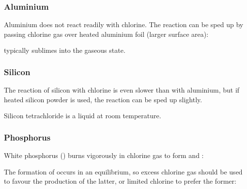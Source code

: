

			\subsubsection{Aluminium}

				Aluminium does not  react readily with chlorine. The reaction can be sped up by passing  chlorine gas
				over heated aluminium foil (larger surface area):


				 typically sublimes into the gaseous state.



			\pagebreak
			\subsubsection{Silicon}

				The reaction of silicon with chlorine is even slower than with aluminium, but if heated silicon powder is used, the
				reaction can be sped up slightly.


				Silicon tetrachloride is a liquid at room temperature.


			\subsubsection{Phosphorus}

				White phosphorus () burns vigorously in chlorine gas to form  and :


				The formation of  occurs in an equilibrium, so excess chlorine gas should be used to favour the production of the latter,
				or limited chlorine to prefer the former:


